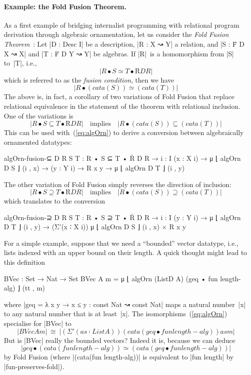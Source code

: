 \paragraph{Example: the Fold Fusion Theorem.}
As a first example of bridging internalist programming with relational program derivation through algebraic ornamentation, let us consider the \emph{Fold Fusion Theorem}~\cite[Section~6.2]{Bird-AoP}:
Let |D : Desc I| be a description, |R : X ↝ Y| a relation, and |S : Ḟ D X ↝ X| and |T : Ḟ D Y ↝ Y| be algebras.
If |R|~is a homomorphism from |S| to~|T|, i.e.,
\[ |R • S ≃ T • Ṙ D R| \]
which is referred to as the \emph{fusion condition}, then we have
\[ |R • (cata(S)) ≃ (cata(T))| \]
The above is, in fact, a corollary of two variations of Fold Fusion that replace relational equivalence in the statement of the theorem with relational inclusion.
One of the variations is
\[ |R • S ⊆ T • Ṙ D R| \quad\text{implies}\quad |R • (cata(S)) ⊆ (cata(T))| \]
This can be used with~(\ref{eq:algOrn}) to derive a conversion between algebraically ornamented datatypes:
\begin{code}
algOrn-fusion-⊆ D R S T :
  R • S ⊆ T • Ṙ D R →
  {i : I} (x : X i) → μ ⌊ algOrn D S ⌋ (i , x) →
  (y : Y i) → R x y → μ ⌊ algOrn D T ⌋ (i , y)
\end{code}
The other variation of Fold Fusion simply reverses the direction of inclusion:
\[ |R • S ⊇ T • Ṙ D R| \quad\text{implies}\quad |R • (cata(S)) ⊇ (cata(T))| \]
which translates to the conversion
\begin{code}algOrn-fusion-⊇ D R S T :
  R • S ⊇ T • Ṙ D R →
  {i : I} (y : Y i) → μ ⌊ algOrn D T ⌋ (i , y) →
  (Σ'(x ∶ X i)) μ ⌊ algOrn D S ⌋ (i , x) × R x y
\end{code}
For a simple example, suppose that we need a ``bounded'' vector datatype, i.e., lists indexed with an upper bound on their length.
A quick thought might lead to this definition
\begin{code}
BVec : Set → Nat → Set
BVec A m =
  μ ⌊ algOrn (ListD A) (geq • fun length-alg) ⌋ (tt , m)
\end{code}
where |geq = λ x y → x ≤ y : const Nat ↝ const Nat| maps a natural number~|x| to any natural number that is at least~|x|.
The isomorphisms~(\ref{eq:algOrn}) specialise for |BVec| to
\[ |BVec A m| ~\cong~ |(Σ'(as ∶ List A)) (cata(geq • fun length-alg)) as m| \]
But is |BVec| really the bounded vectors?
Indeed it is, because we can deduce
\[ |geq • (cata(fun length-alg)) ≃ (cata(geq • fun length-alg))| \]
by Fold Fusion (where |(cata(fun length-alg))| is equivalent to |fun length| by |fun-preserves-fold|).
